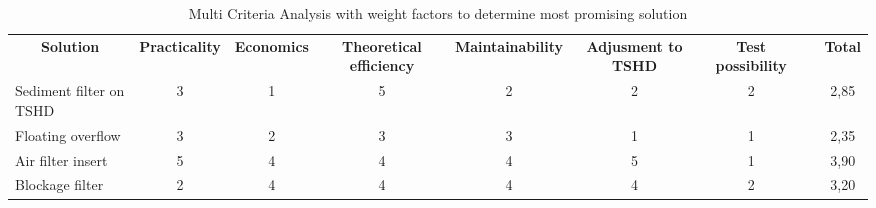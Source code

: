 \begin{table}[ht]
\centering
\caption{Multi Criteria Analysis with weight factors to determine most promising solution}
\label{tab:MCA}
\begin{adjustbox}{max width=\textwidth}
\begin{tabular}{lcccccccc}
\cline{1-7} \cline{9-9}
\multicolumn{1}{|c|}{\textbf{Solution}}       & \multicolumn{1}{c|}{\textbf{Practicality}} & \multicolumn{1}{c|}{\textbf{Economics}} & \multicolumn{1}{c|}{\textbf{Theoretical efficiency}} & \multicolumn{1}{c|}{\textbf{Maintainability}} & \multicolumn{1}{c|}{\textbf{Adjusment to TSHD}} & \multicolumn{1}{c|}{\textbf{Test possibility}} & \multicolumn{1}{c|}{\textbf{}} & \multicolumn{1}{c|}{\textbf{Total}} \\ \cline{1-7} \cline{9-9} 
\multicolumn{1}{|l|}{Sediment filter on TSHD} & \multicolumn{1}{c|}{3}                     & \multicolumn{1}{c|}{1}                  & \multicolumn{1}{c|}{5}                               & \multicolumn{1}{c|}{2}                        & \multicolumn{1}{c|}{2}                          & \multicolumn{1}{c|}{2}                         & \multicolumn{1}{c|}{}          & \multicolumn{1}{c|}{2,85}           \\ \cline{1-7} \cline{9-9} 
\multicolumn{1}{|l|}{Floating overflow}       & \multicolumn{1}{c|}{3}                     & \multicolumn{1}{c|}{2}                  & \multicolumn{1}{c|}{3}                               & \multicolumn{1}{c|}{3}                        & \multicolumn{1}{c|}{1}                          & \multicolumn{1}{c|}{1}                         & \multicolumn{1}{c|}{}          & \multicolumn{1}{c|}{2,35}           \\ \cline{1-7} \cline{9-9} 
\multicolumn{1}{|l|}{Air filter insert}       & \multicolumn{1}{c|}{5}                     & \multicolumn{1}{c|}{4}                  & \multicolumn{1}{c|}{4}                               & \multicolumn{1}{c|}{4}                        & \multicolumn{1}{c|}{5}                          & \multicolumn{1}{c|}{1}                         & \multicolumn{1}{c|}{}          & \multicolumn{1}{c|}{3,90}           \\ \cline{1-7} \cline{9-9} 
\multicolumn{1}{|l|}{Blockage filter}         & \multicolumn{1}{c|}{2}                     & \multicolumn{1}{c|}{4}                  & \multicolumn{1}{c|}{4}                               & \multicolumn{1}{c|}{4}                        & \multicolumn{1}{c|}{4}                          & \multicolumn{1}{c|}{2}                         & \multicolumn{1}{c|}{}          & \multicolumn{1}{c|}{3,20}           \\ \cline{1-7} \cline{9-9} 

\end{tabular}
\end{adjustbox}
\end{table}
